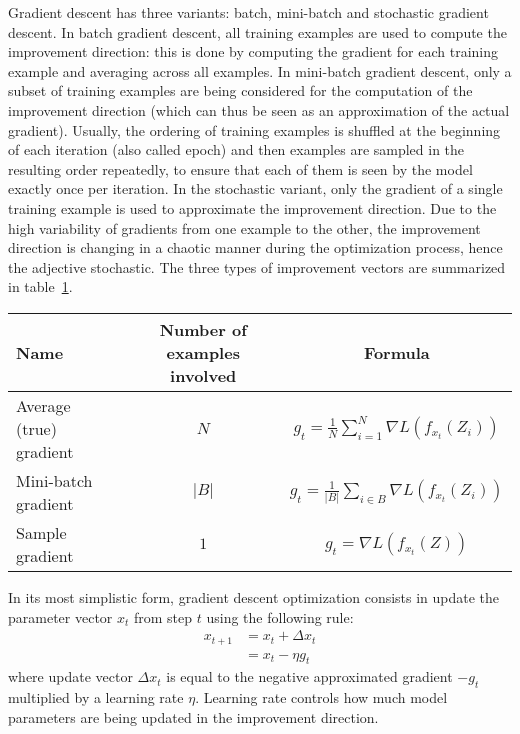         Gradient descent has three variants: batch, mini-batch and stochastic gradient descent.
        In batch gradient descent, all training examples are used to compute the improvement
        direction: this is done by computing the gradient for each training example and averaging
        across all examples. In mini-batch gradient descent, only a subset of training examples
        are being considered for the computation of the improvement direction
        (which can thus be seen as an approximation of the actual gradient). Usually, the ordering
        of training examples is shuffled at the beginning of each iteration (also called epoch)
        and then examples are sampled in the resulting order repeatedly,
        to ensure that each of them is seen by the model exactly once per iteration.
        In the stochastic variant, only the gradient of a single training example is used to
        approximate the improvement direction. Due to the high variability of gradients from one
        example to the other, the improvement direction is changing in a chaotic manner during
        the optimization process, hence the adjective stochastic.
        The three types of improvement vectors are summarized in table~\ref{tab:gradients}.

        \begin{table}[H]
            \centering
            \begin{tabular}{|l|c|c|}
                \hline
                Name & Number of examples involved & Formula \\
                \hline
                \hline
                Average (true) gradient & $N$ & $g_t = \frac{1}{N} \sum\limits_{i=1}^N \nabla L(f_{x_t}(Z_i))$ \\
                \hline
                Mini-batch gradient & $\vert B \vert$ & $g_t = \frac{1}{\vert B \vert} \sum\limits_{i \in B} \nabla L(f_{x_t}(Z_i))$ \\
                \hline
                Sample gradient & $1$ & $g_t = \nabla L(f_{x_t}(Z))$ \\
                \hline
            \end{tabular}
            \label{tab:gradients}
        \end{table}

        In its most simplistic form, gradient descent optimization consists in update the parameter vector $x_t$
        from step $t$ using the following rule:
        \begin{align}
            x_{t+1} & = x_t + \Delta x_t \\
            & = x_t - \eta g_t
        \end{align}
        where update vector $\Delta x_t$ is equal to the negative approximated gradient $-g_t$ multiplied by
        a learning rate $\eta$. Learning rate controls how much model parameters are being updated
        in the improvement direction.

